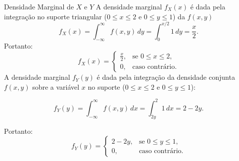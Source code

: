 	\begin{frame}{Densidade Marginal de \( X \) e  \( Y \)}
		A densidade marginal \( f_X(x) \) é dada pela integração no suporte triangular (\( 0 \leq x \leq 2 \) e \( 0 \leq y \leq 1 \)) da $f(x,y)$
		\[
		f_X(x) = \int_{-\infty}^\infty f(x, y) \, dy= \int_0^{x/2} 1 \, dy = \frac{x}{2}.
		\]
		Portanto:
		\[
		f_X(x) =
		\begin{cases}
			\frac{x}{2}, & \text{se } 0 \leq x \leq 2, \\
			0, & \text{caso contrário.}
		\end{cases}
		\]
A densidade marginal \( f_Y(y) \) é dada pela integração da densidade conjunta \( f(x, y) \) sobre a variável \( x \) no suporte (\( 0 \leq x \leq 2 \) e \( 0 \leq y \leq 1 \)):


		\[
		f_Y(y) = \int_{-\infty}^\infty f(x, y) \, dx = \int_{2y}^2 1 \, dx = 2 - 2y.
		\]

		Portanto:
		\[
		f_Y(y) =
		\begin{cases}
			2 - 2y, & \text{se } 0 \leq y \leq 1, \\
			0, & \text{caso contrário.}
		\end{cases}
		\]
	\end{frame}
	
